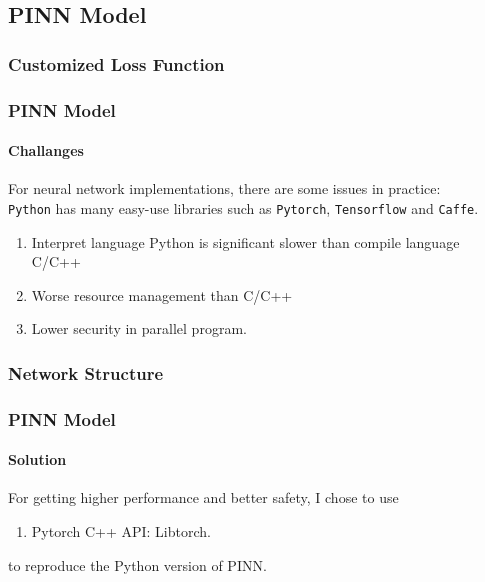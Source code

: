 

\subsection{PINN Model}

\subsubsection{Customized Loss Function}

\begin{frame}
  \frametitle{PINN Model}
  \framesubtitle{Challanges}
  For neural network implementations, there are some issues in practice:\\
  \texttt{Python} has many easy-use libraries such as \texttt{Pytorch}, \texttt{Tensorflow} and \texttt{Caffe}.
  \begin{enumerate}
    \item Interpret language Python is significant slower than compile language C/C++
    \item Worse resource management than C/C++
    \item Lower security in parallel program.
  \end{enumerate}
\end{frame}


\subsubsection{Network Structure}
\begin{frame}
  \frametitle{PINN Model}
  \framesubtitle{Solution}
  For getting higher performance and better safety, I chose to use
  \begin{enumerate}
    \item Pytorch C++ API: Libtorch.
  \end{enumerate}
  to reproduce the Python version of PINN.


\end{frame}




